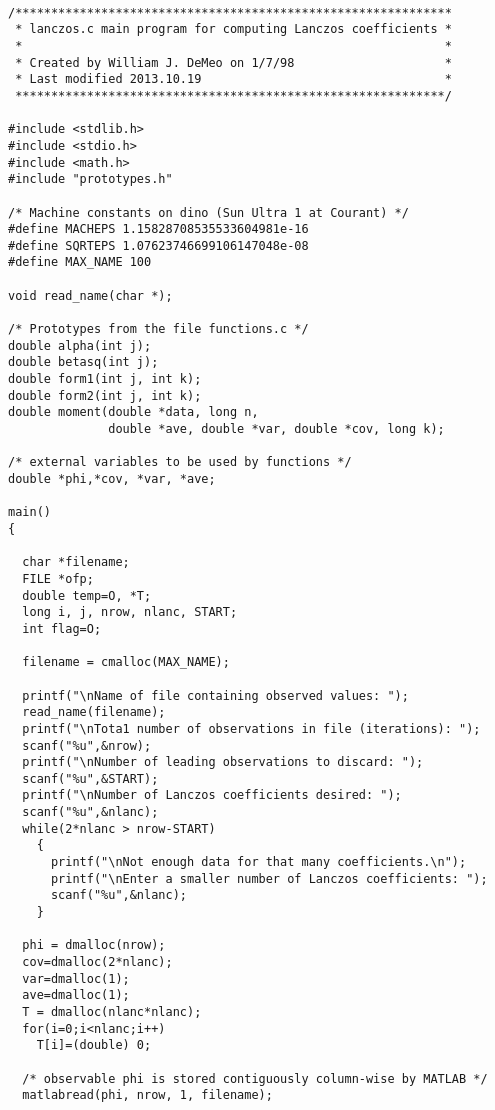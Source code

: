 \vskip2cm



{\small 
\begin{verbatim}




/*************************************************************
 * lanczos.c main program for computing Lanczos coefficients *
 *                                                           *
 * Created by William J. DeMeo on 1/7/98                     *
 * Last modified 2013.10.19                                  *
 ************************************************************/

#include <stdlib.h>
#include <stdio.h>
#include <math.h>
#include "prototypes.h"

/* Machine constants on dino (Sun Ultra 1 at Courant) */
#define MACHEPS 1.15828708535533604981e-16
#define SQRTEPS 1.07623746699106147048e-08
#define MAX_NAME 100

void read_name(char *);

/* Prototypes from the file functions.c */
double alpha(int j);
double betasq(int j);
double form1(int j, int k);
double form2(int j, int k);
double moment(double *data, long n, 
              double *ave, double *var, double *cov, long k);

/* external variables to be used by functions */
double *phi,*cov, *var, *ave;

main()
{

  char *filename;
  FILE *ofp;
  double temp=O, *T;
  long i, j, nrow, nlanc, START;
  int flag=O;

  filename = cmalloc(MAX_NAME);

  printf("\nName of file containing observed values: ");
  read_name(filename);
  printf("\nTota1 number of observations in file (iterations): ");
  scanf("%u",&nrow);
  printf("\nNumber of leading observations to discard: ");
  scanf("%u",&START);
  printf("\nNumber of Lanczos coefficients desired: ");
  scanf("%u",&nlanc);
  while(2*nlanc > nrow-START)
    {
      printf("\nNot enough data for that many coefficients.\n");
      printf("\nEnter a smaller number of Lanczos coefficients: ");
      scanf("%u",&nlanc);
    }

  phi = dmalloc(nrow);
  cov=dmalloc(2*nlanc);
  var=dmalloc(1);
  ave=dmalloc(1);
  T = dmalloc(nlanc*nlanc); 
  for(i=0;i<nlanc;i++) 
    T[i]=(double) 0;

  /* observable phi is stored contiguously column-wise by MATLAB */
  matlabread(phi, nrow, 1, filename);


\end{verbatim}}
